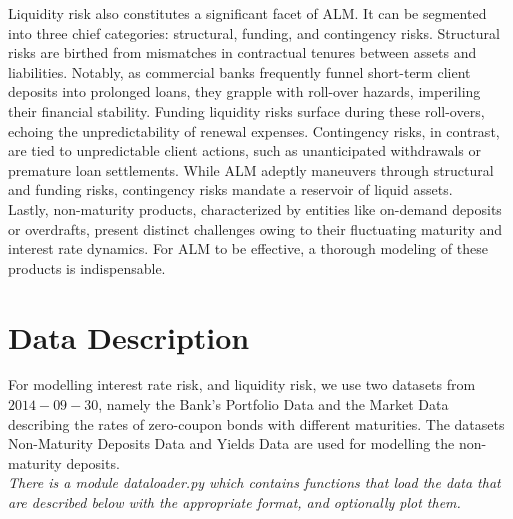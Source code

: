 \documentclass[11pt]{report}
\begin{document}
Liquidity risk also constitutes a significant facet of ALM. It can be segmented into three chief categories: structural, funding, and contingency risks. Structural risks are birthed from mismatches in contractual tenures between assets and liabilities. Notably, as commercial banks frequently funnel short-term client deposits into prolonged loans, they grapple with roll-over hazards, imperiling their financial stability. Funding liquidity risks surface during these roll-overs, echoing the unpredictability of renewal expenses. Contingency risks, in contrast, are tied to unpredictable client actions, such as unanticipated withdrawals or premature loan settlements. While ALM adeptly maneuvers through structural and funding risks, contingency risks mandate a reservoir of liquid assets.\\

Lastly, non-maturity products, characterized by entities like on-demand deposits or overdrafts, present distinct challenges owing to their fluctuating maturity and interest rate dynamics. For ALM to be effective, a thorough modeling of these products is indispensable.





\chapter{Data Description}\label{data_description}


For modelling interest rate risk, and liquidity risk, we use two datasets from $2014-09-30$, namely the Bank's Portfolio Data and the Market Data describing the rates of zero-coupon bonds with different maturities. The datasets Non-Maturity Deposits Data and Yields Data are used for modelling the non-maturity deposits.\\

\textit{There is a module dataloader.py which contains functions that load the data that are described below with the appropriate format, and optionally plot them.}
\end{document}
